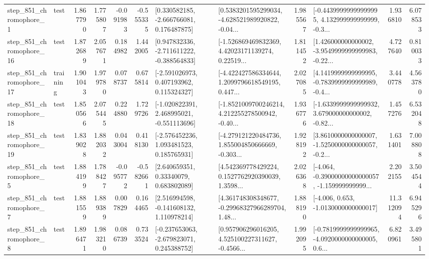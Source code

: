 \begin{tabular}{llrrrrllrlrr}
   step\_851\_chromophore\_1 &      test &      1.867790 &    1.775807 &     -0.091983 & -0.555335 &    [0.330582185, -2.666766081, 0.176487875] &  [0.5383201595299034, -4.628521989920822, -0.04... &       1.985567 &  [-0.44399999999999995, 4.132999999999999, -0.3... &            1.936810 &          6.078533 \\
  step\_851\_chromophore\_16 &      test &      1.872689 &    2.057671 &      0.184982 &  1.442005 &   [0.947832336, -2.711611222, -0.388564833] &  [-1.526869469832369, 4.42023171139274, 0.22519... &       1.811452 &  [1.426000000000002, -3.9549999999999983, -0.22... &            4.727640 &          0.810033 \\
  step\_851\_chromophore\_17 &  training &      1.901043 &    1.979780 &      0.078737 &  0.675814 &    [-2.591026973, 0.407193962, 0.115324327] &  [-4.422427586334644, 1.2099796618549195, 0.447... &       2.027085 &  [4.1419999999999995, -0.7839999999999989, -0.4... &            3.440778 &          4.563780 \\
  step\_851\_chromophore\_18 &      test &      1.850566 &    2.075445 &      0.224880 &  1.729726 &   [-1.020822391, 2.468995021, -0.551113696] &  [-1.8521009700246214, 4.212255278500942, -0.40... &       1.936776 &  [-1.6339999999999932, 3.679000000000002, -0.82... &            1.457276 &          6.532048 \\
  step\_851\_chromophore\_19 &      test &      1.839028 &    1.882032 &      0.043004 &  0.418130 &    [-2.576452236, 1.093481523, 0.185765931] &  [-4.279121220484736, 1.855004850666669, -0.303... &       1.928192 &  [3.8610000000000007, -1.5250000000000057, -0.2... &            1.631401 &          7.008808 \\
   step\_851\_chromophore\_5 &      test &      1.884199 &    1.788427 &     -0.095772 & -0.582661 &      [2.640659351, 0.33340079, 0.683802089] &  [4.542369778429224, 0.1527762920390039, 1.3598... &       2.026368 &  [-4.064, -0.39000000000000057, -1.159999999999... &            2.202155 &          3.504544 \\
   step\_851\_chromophore\_7 &      test &      1.881559 &    1.889389 &      0.007829 &  0.164465 &    [2.516994598, -0.141608132, 1.110978214] &  [4.361748308348677, -0.29968327966289704, 1.48... &       1.888190 &               [-4.006, 0.653, -1.0130000000000017] &           11.312094 &          6.945296 \\
   step\_851\_chromophore\_8 &      test &      1.896471 &    1.983210 &      0.086739 &  0.733524 &   [-0.237653063, -2.679823071, 0.245388752] &  [0.957906296016205, 4.525100227311627, -0.4566... &       1.992095 &  [-0.7819999999999965, -4.0920000000000005, 0.6... &            6.820961 &          3.495801 \\

\end{tabular}
